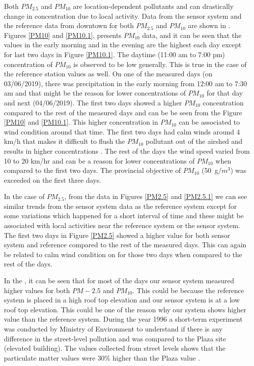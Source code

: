 Both $PM_{2.5}$ and $PM_{10}$ are location-dependent pollutants and can drastically change in concentration due to local activity. Data from the sensor system and the reference data from downtown for both $PM_{2.5}$ and $PM_{10}$ are shown in . Figures \ref{PM10} and \ref{PM10.1}, presents $PM_{10}$ data, and it can be seen that the values in the early morning and in the evening are the highest each day except for last two days in Figure \ref{PM10.1}. The daytime (11:00 am to 7:00 pm) concentration of $PM_{10}$ is observed to be low generally. This is true in the case of the reference station values as well. On one of the measured days (on 03/06/2019), there was precipitation in the early morning from 12:00 am to 7:30 am and that might be the reason for lower concentrations of $PM_{10}$ for that day and next (04/06/2019). The first two days showed a higher $PM_{10}$ concentration compared to the rest of the measured days and can be be seen from the Figure \ref{PM10} and \ref{PM10.1}. This higher concentration in $PM_{10}$ can be associated to wind condition around that time. The first two days had calm winds around 4 km/h that makes it difficult to flush the $PM_{10}$ pollutant out of the airshed and results in higher concentrations \cite{EnvironmentalQualitySectionMoE2012}. The rest of the days the wind speed varied from 10 to 20 km/hr and can be a reason for lower concentrations of $PM_{10}$ when compared to the first two days. The provincial objective of $PM_{10}$ (50~{\textmu}g$/m^3$) was exceeded on the first three days.


In the case of $PM_{2.5}$,  from the data in Figures \ref{PM2.5} and \ref{PM2.5.1} we can see similar trends from the sensor system data as the reference system except for some variations which happened for a short interval of time and these might be associated with local activities near the reference system or the sensor system. The first two days in Figure \ref{PM2.5} showed a higher value for both sensor system and reference compared to the rest of the measured days. This can again be related to calm wind condition on for those two days when compared to the rest of the days. 


In the , it can be seen that for most of the days our sensor system measured higher values for both $PM-{2.5}$ and $PM_{10}$. This could be because the reference system is placed in a high roof top elevation and our sensor system is at a low roof top elevation. This could be one of the reason why our system shows higher value than the reference system. During the year 1996 a short-term experiment was conducted by Ministry of Environment to understand if there is any difference in the street-level pollution and was compared to the Plaza site (elevated building). The values collected from street levels shows that the particulate matter values were 30$\%$ higher than the Plaza value \cite{Environment2010}.


